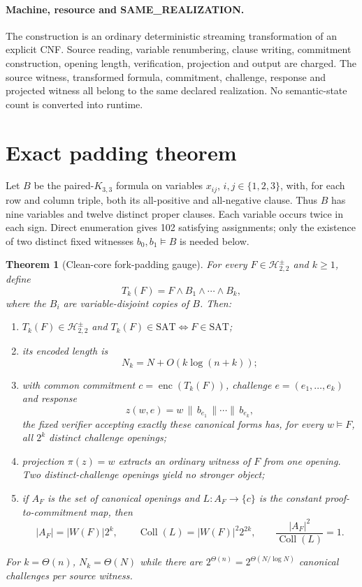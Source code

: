 \documentclass[11pt]{article}
\newtheorem{theorem}{Theorem}
\newcommand{\SAT}{\mathrm{SAT}}
\begin{document}
\paragraph{Machine, resource and SAME\_REALIZATION.}
The construction is an ordinary deterministic streaming transformation of an
explicit CNF.  Source reading, variable renumbering, clause writing,
commitment construction, opening length, verification, projection and output
are charged.  The source witness, transformed formula, commitment, challenge,
response and projected witness all belong to the same declared realization.
No semantic-state count is converted into runtime.

\section{Exact padding theorem}

Let $B$ be the paired-$K_{3,3}$ formula on variables $x_{ij}$,
$i,j\in\{1,2,3\}$, with, for each row and column triple, both its all-positive
and all-negative clause.  Thus $B$ has nine variables and twelve distinct
proper clauses.  Each variable occurs twice in each sign.  Direct enumeration
gives 102 satisfying assignments; only the existence of two distinct fixed
witnesses $b_0,b_1\models B$ is needed below.

\begin{theorem}[Clean-core fork-padding gauge]
\label{thm:gauge}
For every $F\in\mathcal H_{2,2}^{\pm}$ and $k\ge1$, define
\[
 T_k(F)=F\wedge B_1\wedge\cdots\wedge B_k,
\]
where the $B_i$ are variable-disjoint copies of $B$.  Then:
\begin{enumerate}
\item $T_k(F)\in\mathcal H_{2,2}^{\pm}$ and
      $T_k(F)\in\SAT\iff F\in\SAT$;
\item its encoded length is
\[
 N_k=N+O\!\left(k\log(n+k)\right);
\]
\item with common commitment $c=\operatorname{enc}(T_k(F))$, challenge
$e=(e_1,\ldots,e_k)$ and response
\[
 z(w,e)=w\,\|\,b_{e_1}\,\|\cdots\|\,b_{e_k},
\]
the fixed verifier accepting exactly these canonical forms has, for every
$w\models F$, all $2^k$ distinct challenge openings;
\item projection $\pi(z)=w$ extracts an ordinary witness of $F$ from one
opening.  Two distinct-challenge openings yield no stronger object;
\item if $A_F$ is the set of canonical openings and $L:A_F\to\{c\}$ is the
constant proof-to-commitment map, then
\[
 |A_F|=|W(F)|2^k,\qquad
 \operatorname{Coll}(L)=|W(F)|^2 2^{2k},
\qquad
 \frac{|A_F|^2}{\operatorname{Coll}(L)}=1.
\]
\end{enumerate}
For $k=\Theta(n)$, $N_k=\Theta(N)$ while there are
$2^{\Theta(n)}=2^{\Theta(N/\log N)}$ canonical challenges per source witness.
\end{theorem}
\end{document}
